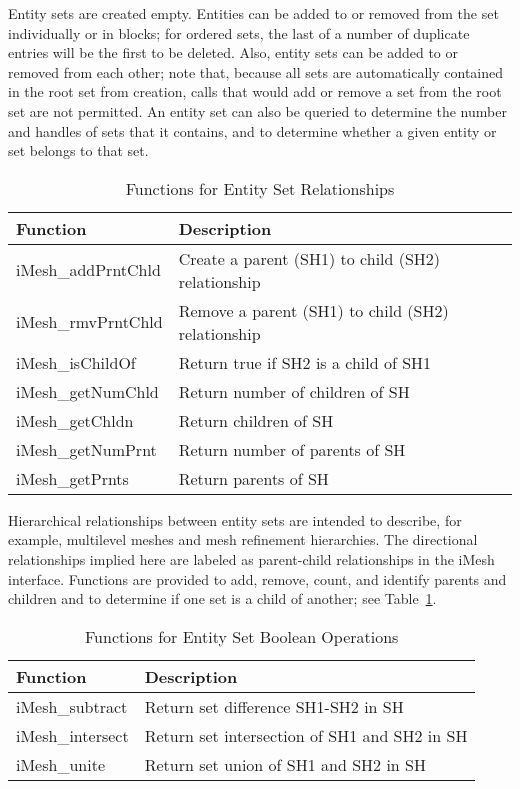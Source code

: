 Entity sets are created empty. Entities can be added to or removed
from the set individually or in blocks; for ordered sets, the last
of a number of duplicate entries will be the first to be deleted.
Also, entity sets can be added to or removed from each other; note
that, because all sets are automatically contained in the root set
from creation, calls that would add or remove a set from the root
set are not permitted. An entity set can also be queried to determine
the number and handles of sets that it contains, and to determine
whether a given entity or set belongs to that set.

%
\begin{table}

\caption{Functions for Entity Set Relationships}

\label{table:SetRel} \begin{tabular}{|p{1.25in}|p{223pt}|}
\hline 
{\small Function}&
{\small Description}\tabularnewline
\hline
\hline 
{\small iMesh\_addPrntChld}&
{\small Create a parent (SH1) to child (SH2) relationship}\tabularnewline
\hline 
{\small iMesh\_rmvPrntChld}&
{\small Remove a parent (SH1) to child (SH2) relationship}\tabularnewline
\hline 
{\small iMesh\_isChildOf}&
{\small Return true if SH2 is a child of SH1}\tabularnewline
\hline 
{\small iMesh\_getNumChld}&
{\small Return number of children of SH}\tabularnewline
\hline 
{\small iMesh\_getChldn}&
{\small Return children of SH}\tabularnewline
\hline 
{\small iMesh\_getNumPrnt}&
{\small Return number of parents of SH}\tabularnewline
\hline 
{\small iMesh\_getPrnts}&
{\small Return parents of SH}\tabularnewline
\hline
\end{tabular}
\end{table}


Hierarchical relationships between entity sets are intended to describe,
for example, multilevel meshes and mesh refinement hierarchies. The
directional relationships implied here are labeled as parent-child
relationships in the iMesh interface. Functions are provided to add,
remove, count, and identify parents and children and to determine
if one set is a child of another; see Table~\ref{table:SetRel}.

%
\begin{table}

\caption{Functions for Entity Set Boolean Operations}

\label{table:SetBool} \begin{tabular}{|p{1.25in}|p{223pt}|}
\hline 
{\small Function}&
{\small Description}\tabularnewline
\hline
\hline 
{\small iMesh\_subtract}&
{\small Return set difference SH1-SH2 in SH}\tabularnewline
\hline 
{\small iMesh\_intersect}&
{\small Return set intersection of SH1 and SH2 in SH}\tabularnewline
\hline 
{\small iMesh\_unite}&
{\small Return set union of SH1 and SH2 in SH}\tabularnewline
\hline
\end{tabular}
\end{table}


